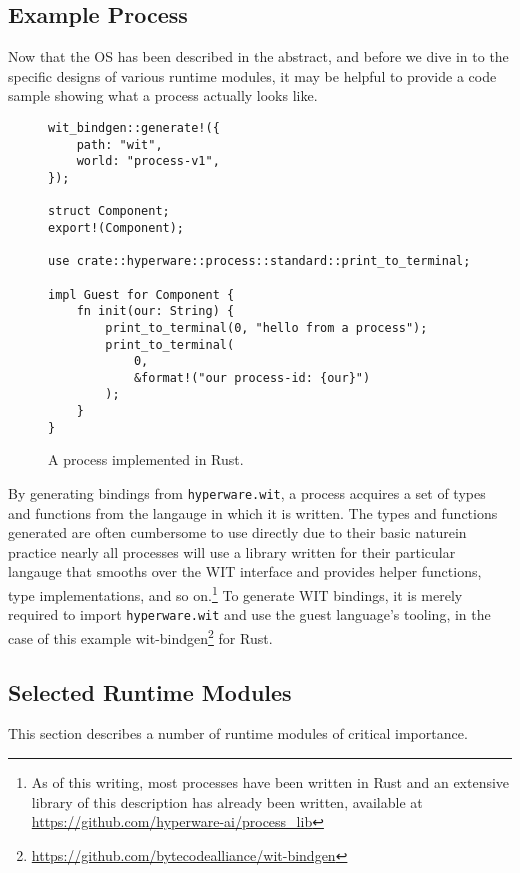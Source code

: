 \documentclass[runningheads]{llncs}
\begin{document}
\subsection{Example Process}
\label{sec:osexampleprocess}

Now that the OS has been described in the abstract, and before we dive in to the specific designs of various runtime modules, it may be helpful to provide a code sample showing what a process actually looks like.

\begin{figure}[H]
\begin{verbatim}
wit_bindgen::generate!({
    path: "wit",
    world: "process-v1",
});

struct Component;
export!(Component);

use crate::hyperware::process::standard::print_to_terminal;

impl Guest for Component {
    fn init(our: String) {
        print_to_terminal(0, "hello from a process");
        print_to_terminal(
            0,
            &format!("our process-id: {our}")
        );
    }
}
\end{verbatim}
    \caption{A process implemented in Rust.}
    \label{fig:example process}
\end{figure}

By generating bindings from \verb|hyperware.wit|, a process acquires a set of types and functions from the langauge in which it is written.
The types and functions generated are often cumbersome to use directly due to their basic nature\textemdash in practice nearly all processes will use a library written for their particular langauge that smooths over the WIT interface and provides helper functions, type implementations, and so on.\footnote{ As of this writing, most processes have been written in Rust and an extensive library of this description has already been written, available at \url{https://github.com/hyperware-ai/process\_lib} }
To generate WIT bindings, it is merely required to import \verb|hyperware.wit| and use the guest language's tooling, in the case of this example wit-bindgen\footnote{\url{https://github.com/bytecodealliance/wit-bindgen}} for Rust.

\subsection{Selected Runtime Modules}
\label{sec:osmodules}

This section describes a number of runtime modules of critical importance.
\end{document}
